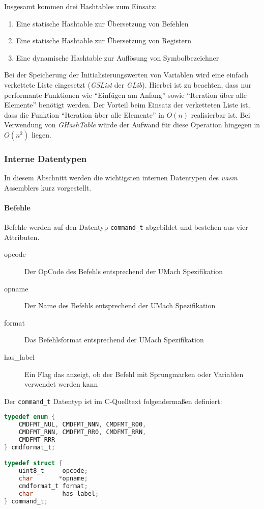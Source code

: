 Insgesamt kommen drei Hashtables zum Einsatz:
\begin{enumerate}
    \item Eine statische Hashtable zur Übersetzung von Befehlen
    \item Eine statische Hashtable zur Übersetzung von Registern
    \item Eine dynamische Hashtable zur Auflösung von Symbolbezeichner
\end{enumerate}

Bei der Speicherung der Initialisierungswerten von Variablen wird eine
einfach verkettete Liste eingesetzt (\emph{GSList} der \emph{GLib}).
Hierbei ist zu beachten, dass nur performante Funktionen wie
``Einfügen am Anfang'' sowie ``Iteration über alle Elemente'' benötigt werden.
Der Vorteil beim Einsatz der verketteten Liste ist, dass die
Funktion ``Iteration über alle Elemente'' in $O(n)$ realisierbar ist. Bei
Verwendung von \emph{GHashTable} würde der Aufwand für diese Operation hingegen
in $O(n^2)$ liegen.

\subsubsection{Interne Datentypen}

In diesem Abschnitt werden die wichtigsten internen Datentypen des \emph{uasm}
Assemblers kurz vorgestellt.

\paragraph{Befehle} Befehle werden auf den Datentyp \texttt{command\_t}
abgebildet und bestehen aus vier Attributen.

\begin{description}
    \item[opcode] Der OpCode des Befehls entsprechend der UMach Spezifikation
    \item[opname] Der Name des Befehls entsprechend der UMach Spezifikation
    \item[format] Das Befehlsformat entsprechend der UMach Spezifikation
    \item[has\_label] Ein Flag das anzeigt, ob der Befehl mit Sprungmarken oder
                      Variablen verwendet werden kann
\end{description}

Der \texttt{command\_t} Datentyp ist im C-Quelltext folgendermaßen definiert:

\begin{lstlisting}[language=C]
typedef enum {
    CMDFMT_NUL, CMDFMT_NNN, CMDFMT_R00,
    CMDFMT_RNN, CMDFMT_RR0, CMDFMT_RRN,
    CMDFMT_RRR
} cmdformat_t;

typedef struct {
    uint8_t     opcode;
    char       *opname;
    cmdformat_t format;
    char        has_label;
} command_t;
\end{lstlisting}

